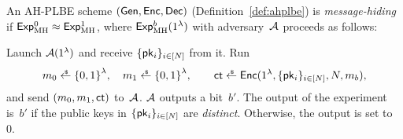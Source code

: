 \begin{definition}\label{def:ahplbe-message-hiding}
An AH-PLBE scheme $({\smash{\mathsf{Gen}}},{\smash{\mathsf{Enc}}},{\smash{\mathsf{Dec}}})$ (Definition~\ref{def:ahplbe})
is \emph{message-hiding} if ${{\smash{\mathsf{Exp}}_{\textup{MH}}^{0}}\approx{\smash{\mathsf{Exp}}_{\textup{MH}}^{1}}}$,
where ${\smash{\mathsf{Exp}}_{\textup{MH}}^{b}}(1^\lambda)$ with adversary~${\mathcal{A}}$ proceeds as follows:
\begin{security}
Launch ${\mathcal{A}}(1^\lambda)$ and
receive $\{{\smash{\mathsf{pk}}}_i\}_{i\in[N]}$ from it.
Run
\begin{align*}
m_0\draws\bit^\lambda,\quad
m_1\draws\bit^\lambda,\qquad
\ct\draws\Enc(1^\lambda,\{\pk_i\}_{i\in[N]},N,m_b),
\end{align*}
and send $(m_0,m_1,{\smash{\mathsf{ct}}})$ to~${\mathcal{A}}$.
${\mathcal{A}}$ outputs a bit~$b'$.
The output of the experiment is~$b'$
if the public keys in $\{{\smash{\mathsf{pk}}}_i\}_{i\in[N]}$ are \emph{distinct}.
Otherwise, the output is set to~$0$.
\end{security}
\end{definition}
